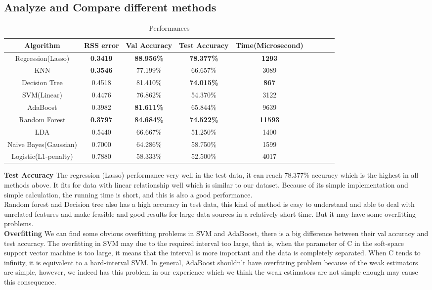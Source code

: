\documentclass{article}
\begin{document}
\subsection{Analyze and Compare different methods}
\begin{table}
	\caption{Performances}
	\label{sample-table}
	\centering
	\begin{tabular}{ccccccccc}
		\toprule
		Algorithm     & RSS error     & Val Accuracy  & Test Accuracy & Time(Microsecond)\\
		\midrule
		Regression(Lasso) & \textbf{0.3419}  & \textbf{88.956\%} & \textbf{78.377\%} & \textbf{1293}    \\
		KNN     & \textbf{0.3546} & 77.199\%   & 66.657\% & 3089  \\
		Decision Tree     & 0.4518       & 81.410\%  & \textbf{74.015\%} & \textbf{867}\\
		SVM(Linear)     & 0.4476      & 76.862\% & 54.370\% & 3122\\
		AdaBoost     & 0.3982       & \textbf{81.611\%} & 65.844\% & 9639\\
		Random Forest    & \textbf{0.3797}       & \textbf{84.684\%} & \textbf{74.522\%} & \textbf{11593} \\
		LDA   & 0.5440       & 66.667\% & 51.250\% & 1400\\
		Naive Bayes(Gaussian)    & 0.7000       & 64.286\% & 58.750\% & 1599 \\
		Logistic(L1-penalty)    & 0.7880       & 58.333\%  &52.500\% & 4017\\
		\bottomrule
	\end{tabular}
\end{table}
\textbf{Test Accuracy}
The regression (Lasso) performance very well in the test data, it can reach $78.377\%$ accuracy which is the highest in all methods above. It fits for data with linear relationship well which is similar to our dataset. Because of its simple implementation and simple calculation, the running time is short, and this is also a good performance.
\\Random forest and Decision tree also has a high accuracy in test data, this kind of method is easy to understand and able to deal with unrelated features and make feasible and good results for large data sources in a relatively short time. But it may have some overfitting problems.\\
\textbf{Overfitting}
We can find some obvious overfitting problems in SVM and AdaBoost, there is a big difference between their val accuracy and test accuracy. The overfitting in SVM may due to the required interval too large, that is, when the parameter of C in the soft-space support vector machine is too large, it means that the interval is more important and the data is completely separated. When C tends to infinity, it is equivalent to a hard-interval SVM. In general, AdaBoost shouldn't have overfitting problem because of the weak estimators are simple, however, we indeed has this problem in our experience which we think the weak estimators are not simple enough may cause this consequence.\\
\end{document}
